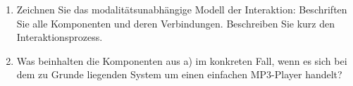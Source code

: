 	
\begin{enumerate}
\item Zeichnen Sie das modalitätsunabhängige Modell der Interaktion: Beschriften
Sie alle Komponenten und deren Verbindungen. Beschreiben Sie kurz den
Interaktionsprozess.

\item Was beinhalten die Komponenten aus a) im konkreten Fall, wenn es sich bei
dem zu Grunde liegenden System um einen einfachen MP3-Player handelt?

\end{enumerate}
